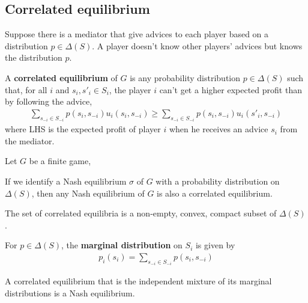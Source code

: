 \documentclass[11pt]{elegantbook}
\begin{document}
\subsection{Correlated equilibrium}
Suppose there is a mediator that give advices to each player based on a distribution $p \in \Delta(S)$. A player doesn't know other players' advices but knows the distribution $p$.
\begin{definition}
    \normalfont
    A \textbf{correlated equilibrium} of $G$ is any probability distribution $p \in \Delta(S)$ such that, for all $i$ and $s_i,s'_i \in S_i$, the player $i$ can't get a higher expected profit than by following the advice,
    \begin{equation}
        \begin{aligned}
            \sum_{s_{-i}\in S_{-i}}p(s_i,s_{-i})u_i(s_i,s_{-i})\geq\sum_{s_{-i}\in S_{-i}}p(s_i,s_{-i})u_i(s'_i,s_{-i})
        \end{aligned}
        \nonumber
    \end{equation}
    where LHS is the expected profit of player $i$ when he receives an advice $s_i$ from the mediator.
\end{definition}

Let $G$ be a finite game,
\begin{proposition}
    If we identify a Nash equilibrium $\sigma$ of $G$ with a probability distribution on $\Delta(S)$, then any Nash equilibrium of $G$ is also a correlated equilibrium.
\end{proposition}

\begin{proposition}
    The set of correlated equilibria is a non-empty, convex, compact subset of $\Delta(S)$.
\end{proposition}

For $p\in\Delta(S)$, the \textbf{marginal distribution} on $S_i$ is given by
\begin{equation}
    \begin{aligned}
        p_i(s_i)=\sum_{s_{-i}\in S_{-i}}p(s_i,s_{-i})
    \end{aligned}
    \nonumber
\end{equation}
\begin{proposition}
    A correlated equilibrium that is the independent mixture of its marginal distributions is a Nash equilibrium.
\end{proposition}
\end{document}
